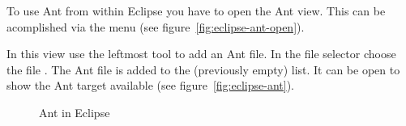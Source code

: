 To use Ant from within Eclipse you have to open the Ant view. This can
be acomplished via the menu  (see
figure~\ref{fig:eclipse-ant-open}).

In this view use the leftmost tool to add an Ant file. In the file
selector choose the file . The Ant file is added
to the (previously empty) list. It can be open to show the Ant target
available (see figure~\ref{fig:eclipse-ant}).
\begin{figure}[htp]
  \hbox{}\hfill
  \hfill
  \caption{Ant in Eclipse}
\end{figure}

